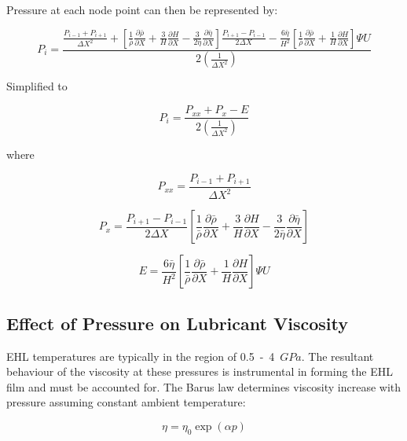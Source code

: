 Pressure at each node point can then be represented by:

\begin{equation}\label{eq3.19}
	P_i=\frac{\frac{P_{i-1}+P_{i+1}}{\Delta X^2}+\left[\frac{1}{\bar{\rho}} \frac{\partial \bar{\rho}}{\partial X}+\frac{3}{H} \frac{\partial H}{\partial X}-\frac{3}{2 \bar{\eta}} \frac{\partial \bar{\eta}}{\partial X}\right] \frac{P_{i+1}-P_{i-1}}{2 \Delta X}-\frac{6 \bar{\eta}}{H^2}\left[\frac{1}{\bar{\rho}} \frac{\partial \bar{\rho}}{\partial X}+\frac{1}{H} \frac{\partial H}{\partial X}\right] \Psi U}{2\left(\frac{1}{\Delta X^2}\right)}
\end{equation}

Simplified to 

\begin{equation}\label{eq3.20}
	P_i=\frac{P_{x x}+P_x-E}{2\left(\frac{1}{\Delta X^2}\right)}
\end{equation}

where

\begin{equation}\label{eq3.21}
	P_{x x}=\frac{P_{i-1}+P_{i+1}}{\Delta X^2}
\end{equation}

\begin{equation}\label{eq3.22}
	P_{x}=\frac{P_{i+1}-P_{i-1}}{2 \Delta X}\left[\frac{1}{\bar{\rho}} \frac{\partial \bar{\rho}}{\partial X}+\frac{3}{H} \frac{\partial H}{\partial X}-\frac{3}{2 \bar{\eta}} \frac{\partial \bar{\eta}}{\partial X}\right]
\end{equation}

\begin{equation}\label{eq3.23}
	E=\frac{6 \bar{\eta}}{H^2}\left[\frac{1}{\bar{\rho}} \frac{\partial \bar{\rho}}{\partial X}+\frac{1}{H} \frac{\partial H}{\partial X}\right] \Psi U
\end{equation}

\subsection{Effect of Pressure on Lubricant Viscosity}

EHL temperatures are typically in the region of 0.5~-~4~$GPa$. The resultant behaviour of the viscosity at these pressures is instrumental in forming the EHL film and must be accounted for. The Barus law \cite{Barus1893} determines viscosity increase with pressure assuming constant ambient temperature: 

\begin{equation}\label{eq3.24}
	\eta=\eta_0 \exp (\alpha p)
\end{equation}

